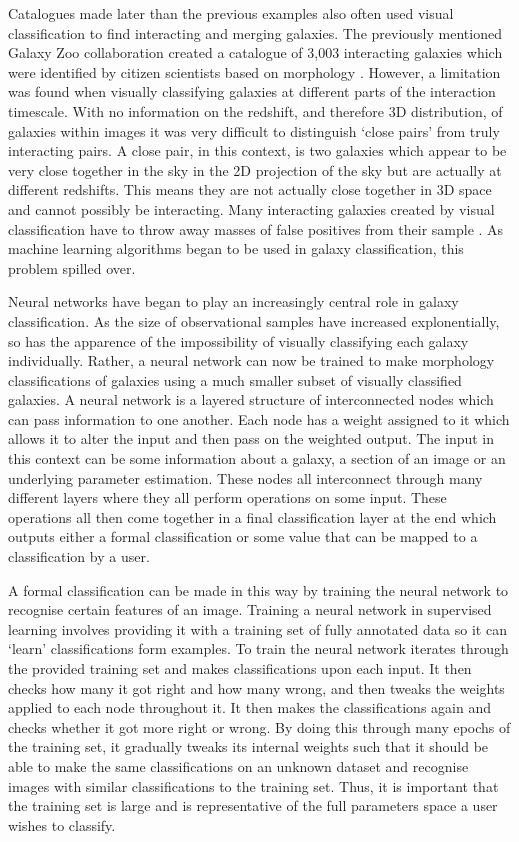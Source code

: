 Catalogues made later than the previous examples also often used visual classification to find interacting and merging galaxies. The previously mentioned Galaxy Zoo collaboration created a catalogue of 3,003 interacting galaxies which were identified by citizen scientists based on morphology \citep{2010MNRAS.401.1043D}. However, a limitation was found when visually classifying galaxies at different parts of the interaction timescale. With no information on the redshift, and therefore 3D distribution, of galaxies within images it was very difficult to distinguish `close pairs' from truly interacting pairs. A close pair, in this context, is two galaxies which appear to be very close together in the sky in the 2D projection of the sky but are actually at different redshifts. This means they are not actually close together in 3D space and cannot possibly be interacting. Many interacting galaxies created by visual classification have to throw away masses of false positives from their sample \citep{2020MNRAS.492.2075B, 2022A&A...661A..52P}. As machine learning algorithms began to be used in galaxy classification, this problem spilled over.

Neural networks have began to play an increasingly central role in galaxy classification. As the size of observational samples have increased explonentially, so has the apparence of the impossibility of visually classifying each galaxy individually. Rather, a neural network can now be trained to make morphology classifications of galaxies using a much smaller subset of visually classified galaxies. A neural network is a layered structure of interconnected nodes which can pass information to one another. Each node has a weight assigned to it which allows it to alter the input and then pass on the weighted output. The input in this context can be some information about a galaxy, a section of an image or an underlying parameter estimation. These nodes all interconnect through many different layers where they all perform operations on some input. These operations all then come together in a final classification layer at the end which outputs either a formal classification or some value that can be mapped to a classification by a user.

A formal classification can be made in this way by training the neural network to recognise certain features of an image. Training a neural network in supervised learning involves providing it with a training set of fully annotated data so it can `learn' classifications form examples. To train the neural network iterates through the provided training set and makes classifications upon each input. It then checks how many it got right and how many wrong, and then tweaks the weights applied to each node throughout it. It then makes the classifications again and checks whether it got more right or wrong. By doing this through many epochs of the training set, it gradually tweaks its internal weights such that it should be able to make the same classifications on an unknown dataset and recognise images with similar classifications to the training set. Thus, it is important that the training set is large and is representative of the full parameters space a user wishes to classify.

